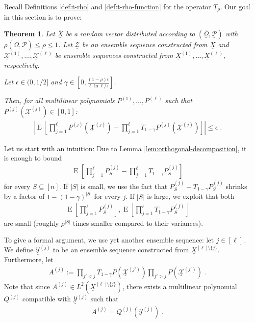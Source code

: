 \documentclass{daj}
\newcommand{\1}{\mathbbm{1}}
\theoremstyle{plain}
\newtheorem{theorem}{Theorem}[section]
\theoremstyle{definition}
\DeclareMathOperator*{\EE}{E}
\begin{document}
Recall Definitions \ref{def:t-rho} and \ref{def:t-rho-function} 
for the operator $T_\rho$. Our goal in this section is to prove:
\begin{theorem}
\label{thm:smoothing}
Let $\overline{\underline{X}}$ be a random vector distributed according
to $(\overline{\underline{\Omega}}, \underline{\mathcal{P}})$
with $\rho(\overline{\Omega}, \mathcal{P}) \le \rho \le 1$.
Let $\underline{\mathcal{Z}}$ be an ensemble sequence constructed from
$\overline{\underline{X}}$ and 
$\underline{\mathcal{X}}^{(1)}, \ldots, \underline{\mathcal{X}}^{(\ell)}$
be ensemble sequences constructed from 
$\underline{X}^{(1)}, \ldots, \underline{X}^{(\ell)}$, respectively.

Let $\epsilon \in (0, 1/2]$ and 
$\gamma \in \left[0, \frac{(1-\rho)\epsilon}{\ell \ln \ell/\epsilon}\right]$.

Then, for all multilinear polynomials $P^{(1)}, \ldots, P^{(\ell)}$ such that
$P^{(j)}(\underline{\mathcal{X}}^{(j)}) \in [0, 1]$:
\begin{align*}
  \left| \EE \left[ \prod_{j=1}^\ell P^{(j)}(\underline{\mathcal{X}}^{(j)})
  - \prod_{j=1}^\ell T_{1-\gamma}P^{(j)}(\underline{\mathcal{X}}^{(j)})
  \right] \right| \le \epsilon \; .
\end{align*}
\end{theorem}

Let us start with an intuition:
Due to Lemma \ref{lem:orthogonal-decomposition},
it is enough to bound
\begin{align*}
\EE\left[ \prod_{j=1}^\ell P_S^{(j)} - \prod_{j=1}^\ell T_{1-\gamma}P^{(j)}_S \right]
\end{align*}
for every $S \subseteq [n]$. If $|S|$ is small, we use the fact that
$P^{(j)}_S-T_{1-\gamma}P_S^{(j)}$ shrinks by a factor of $1-(1-\gamma)^{|S|}$
for every $j$.
If $|S|$ is large, we exploit that both
\begin{align*}
\EE\left[ \prod_{j=1}^\ell P^{(j)}_S\right], 
\EE\left[\prod_{j=1}^\ell T_{1-\gamma}P_S^{(j)}\right]
\end{align*}
are small (roughly $\rho^{|S|}$ times smaller compared to their variances).

To give a formal argument, we use yet another ensemble sequence:
let $j \in [\ell]$. We define  $\underline{\mathcal{Y}}^{(j)}$ to be an
ensemble sequence constructed from $\underline{X}^{[\ell]\setminus\{j\}}$.
Furthermore, let
\begin{align*}
A^{(j)} := \prod_{j' < j} T_{1-\gamma}P(\underline{\mathcal{X}}^{(j')})
\prod_{j' > j} P(\underline{\mathcal{X}}^{(j')}) \; .
\end{align*}
Note that since $A^{(j)} \in L^2(\underline{X}^{[\ell]\setminus\{j\}})$,
there exists a multilinear polynomial $Q^{(j)}$ compatible with
$\underline{\mathcal{Y}}^{(j)}$ such that
\begin{align*}
  A^{(j)} = Q^{(j)}(\underline{\mathcal{Y}}^{(j)}) \; .
\end{align*}
\end{document}
